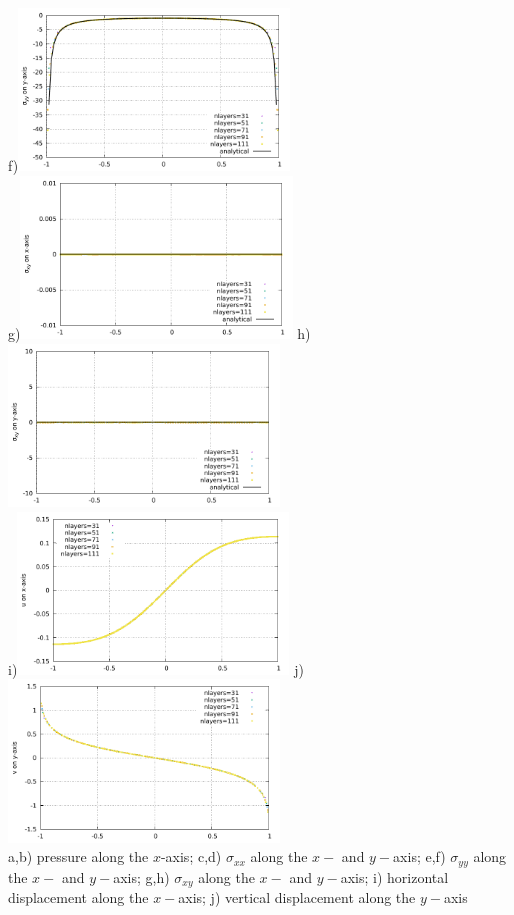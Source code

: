 \begin{center}
f)\includegraphics[width=7.2cm]{python_codes/fieldstone_58/experiment1/sigmayy_yaxis.pdf}\\
g)\includegraphics[width=7.2cm]{python_codes/fieldstone_58/experiment1/sigmaxy_xaxis.pdf}
h)\includegraphics[width=7.2cm]{python_codes/fieldstone_58/experiment1/sigmaxy_yaxis.pdf}\\
i)\includegraphics[width=7.2cm]{python_codes/fieldstone_58/experiment1/u_xaxis.pdf}
j)\includegraphics[width=7.2cm]{python_codes/fieldstone_58/experiment1/v_yaxis.pdf}\\
{\captionfont a,b) pressure along the $x$-axis;
c,d) $\sigma_{xx}$  along the $x-$ and $y-$axis; 
e,f) $\sigma_{yy}$  along the $x-$ and $y-$axis; 
g,h) $\sigma_{xy}$  along the $x-$ and $y-$axis; 
i) horizontal displacement along the $x-$axis; 
j) vertical displacement along the $y-$axis}
\end{center}


